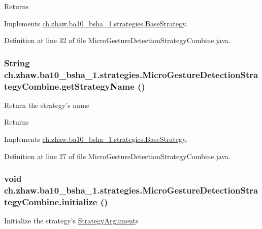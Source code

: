 \begin{DoxyReturn}{Returns}

\end{DoxyReturn}


Implements \hyperlink{classch_1_1zhaw_1_1ba10__bsha__1_1_1strategies_1_1BaseStrategy_a75fdb36932ad701f6375cc1fe718056b}{ch.zhaw.ba10\_\-bsha\_\-1.strategies.BaseStrategy}.

Definition at line 32 of file MicroGestureDetectionStrategyCombine.java.\hypertarget{classch_1_1zhaw_1_1ba10__bsha__1_1_1strategies_1_1MicroGestureDetectionStrategyCombine_ad7fdf02bda8daf2d3bd177e23a270f11}{
\subsubsection[{getStrategyName}]{\setlength{\rightskip}{0pt plus 5cm}String ch.zhaw.ba10\_\-bsha\_\-1.strategies.MicroGestureDetectionStrategyCombine.getStrategyName ()}}
\label{classch_1_1zhaw_1_1ba10__bsha__1_1_1strategies_1_1MicroGestureDetectionStrategyCombine_ad7fdf02bda8daf2d3bd177e23a270f11}
Return the strategy's name

\begin{DoxyReturn}{Returns}

\end{DoxyReturn}


Implements \hyperlink{classch_1_1zhaw_1_1ba10__bsha__1_1_1strategies_1_1BaseStrategy_aa0ebed55eed45409bad13d43a0058780}{ch.zhaw.ba10\_\-bsha\_\-1.strategies.BaseStrategy}.

Definition at line 27 of file MicroGestureDetectionStrategyCombine.java.\hypertarget{classch_1_1zhaw_1_1ba10__bsha__1_1_1strategies_1_1MicroGestureDetectionStrategyCombine_ad9982cce2bbecd3246b3838b28bd95e7}{
\subsubsection[{initialize}]{\setlength{\rightskip}{0pt plus 5cm}void ch.zhaw.ba10\_\-bsha\_\-1.strategies.MicroGestureDetectionStrategyCombine.initialize ()}}
\label{classch_1_1zhaw_1_1ba10__bsha__1_1_1strategies_1_1MicroGestureDetectionStrategyCombine_ad9982cce2bbecd3246b3838b28bd95e7}
Initialize the strategy's \hyperlink{classch_1_1zhaw_1_1ba10__bsha__1_1_1StrategyArgument}{StrategyArgument}s 

